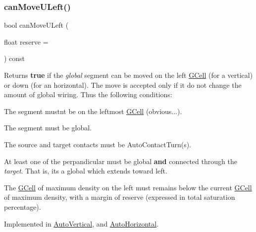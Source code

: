 \subsubsection{\texorpdfstring{can\+Move\+U\+Left()}{canMoveULeft()}}
{\footnotesize\ttfamily bool can\+Move\+U\+Left (\begin{DoxyParamCaption}\item[{float}]{reserve = {} }\end{DoxyParamCaption}) const\hspace{0.3cm}{\ttfamily [pure virtual]}}

\begin{DoxyReturn}{Returns}
{\bfseries true} if the {\itshape global} segment can be moved on the left \mbox{\hyperlink{classKatabatic_1_1GCell}{G\+Cell}} (for a vertical) or down (for an horizontal). The move is accepted only if it do not change the amount of global wiring. Thus the following conditions\+:
\begin{DoxyItemize}
\item The segment mustn\textquotesingle{}t be on the leftmost \mbox{\hyperlink{classKatabatic_1_1GCell}{G\+Cell}} (obvious...).
\item The segment must be global.
\item The source and target contacts must be Auto\+Contact\+Turn(s).
\item At least one of the perpandicular must be global {\bfseries and} connected through the {\itshape target}. That is, it\textquotesingle{}s a global which extends toward left.
\item The \mbox{\hyperlink{classKatabatic_1_1GCell}{G\+Cell}} of maximum density on the left must remains below the current \mbox{\hyperlink{classKatabatic_1_1GCell}{G\+Cell}} of maximum density, with a margin of {\ttfamily reserve} (expressed in total saturation percentage). 
\end{DoxyItemize}
\end{DoxyReturn}


Implemented in \mbox{\hyperlink{classKatabatic_1_1AutoVertical_a9b0c21eeb26c256876592ba63438da74}{Auto\+Vertical}}, and \mbox{\hyperlink{classKatabatic_1_1AutoHorizontal_a9b0c21eeb26c256876592ba63438da74}{Auto\+Horizontal}}.

\mbox{\label{classKatabatic_1_1AutoSegment_a096deb8a143f098eac2bff9ab9c52243}} 

